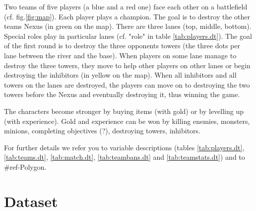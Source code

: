 \documentclass[a4paper,oneside,10pt]{article}
\begin{document}
Two teams of five players (a blue and a red one) face each other on a battlefield (cf. fig.\ref{fig:map}). Each player plays a champion. The goal is to destroy the other teams Nexus (in green on the map). There are three lanes (top, middle, bottom). Special roles play in particular lanes (cf. "role" in table \ref{tab:players.dt}). The goal of the first round is to destroy the three opponents towers (the three dots per lane between the river and the base). When players on some lane manage to destroy the three towers, they move to help other players on other lanes or begin destroying the inhibitors (in yellow on the map). When all inhibitors and all towers on the lanes are destroyed, the players can move on to destroying the two towers before the Nexus and eventually destroying it, thus winning the game.

The characters become stronger by buying items (with gold) or by levelling up (with experience). Gold and experience can be won by killing enemies, monsters, minions, completing objectives (?), destroying towers, inhibitors.

For further details we refer you to variable descriptions (tables \ref{tab:players.dt}, \ref{tab:teams.dt}, \ref{tab:match.dt}, \ref{tab:teambans.dt} and \ref{tab:teamstats.dt}) and to \#ref-Polygon.

\section{Dataset}


\end{document}
